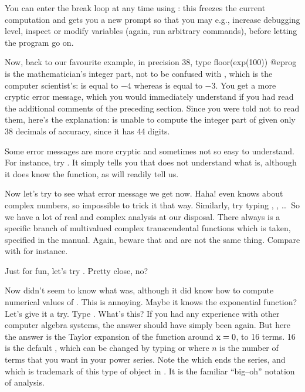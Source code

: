  You can enter the break loop at any time using
: this freezes the current computation and gets you a new
prompt so that you may e.g., increase debugging level, inspect or modify
variables (again, run arbitrary commands), before letting the program go
on.
\medskip

Now, back to our favourite example, in precision 38, type
\bprog
  floor(exp(100))
@eprog\noindent
{} is the mathematician's integer part, not to be confused with
, which is the computer scientist's:  is equal
to $-4$ whereas  is equal to $-3$.  You get a more
cryptic error message, which you would immediately understand if you had read
the additional comments of the preceding section. Since you were told not to
read them, here's the explanation:  is unable to compute the
integer part of  given only 38 decimals of accuracy, since
it has 44 digits.

Some error messages are more cryptic and sometimes not so easy to understand.
For instance, try . It simply tells you that  does not
understand what  is, although it does know the 
function, as  will readily tell us.

Now let's try  to see what error message we get now. Haha!
 even knows about complex numbers, so impossible to trick it that
way. Similarly, try typing , , \dots\ So we have a lot of real and complex analysis at our disposal.
There always is a specific branch of multivalued complex transcendental
functions which is taken, specified in the manual. Again, beware that
 and  are not the same thing. Compare  with
 for instance.

Just for fun, let's try . Pretty close, no?

\medskip
Now  didn't seem to know what  was, although it did know
how to compute numerical values of . This is annoying. Maybe it
knows the exponential function? Let's give it a try. Type .
What's this? If you had any experience with other computer algebra systems,
the answer should have simply been  again. But here the answer is
the Taylor expansion of the function around ${\tt x}=0$, to 16 terms. 16 is
the default , which can be changed by typing  or  where $n$ is the number of terms
that you want in your power series. Note the  which ends the
series, and which is trademark of this type of object in . It is the
familiar ``big--oh'' notation of analysis.

